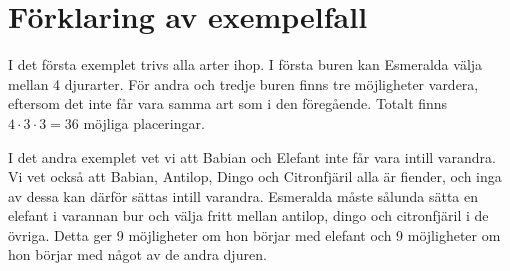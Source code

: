 \section*{Förklaring av exempelfall}
I det första exemplet trivs alla arter ihop. I första buren kan Esmeralda välja mellan 4 djurarter. För andra och tredje buren finns tre möjligheter vardera, eftersom det inte får vara samma art som i den föregående. Totalt finns $4\cdot 3\cdot 3=36$ möjliga placeringar.

I det andra exemplet vet vi att Babian och Elefant inte får vara intill varandra. Vi vet också att Babian, Antilop, Dingo och Citronfjäril alla är fiender, och inga av dessa kan därför sättas intill varandra. Esmeralda måste sålunda sätta en elefant i varannan bur och välja fritt mellan antilop, dingo och citronfjäril i de övriga. Detta ger 9 möjligheter om hon börjar med elefant och 9 möjligheter om hon börjar med något av de andra djuren.
